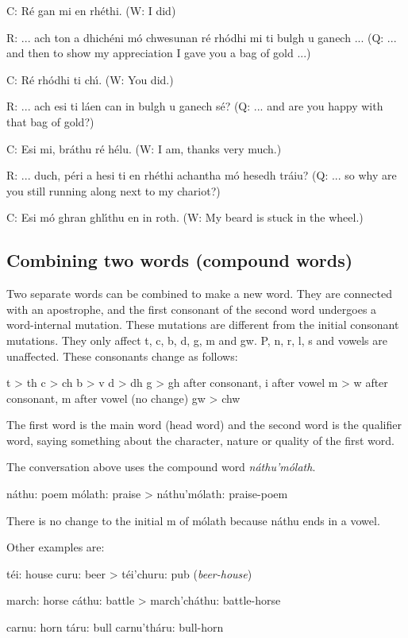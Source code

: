 C: R\'{e} gan mi en rh\'{e}thi.
(W: I did)

R: ... ach ton a dhich\'{e}ni m\'{o} chwesunan r\'{e} rh\'{o}dhi mi ti bulgh u ganech ...
(Q: ... and then to show my appreciation I gave you a bag of gold ...)

C: R\'{e} rh\'{o}dhi ti ch\'{\i}.
(W: You did.)

R: ... ach esi ti l\'{a}en can in bulgh u ganech s\'{e}?
(Q: ... and are you happy with that bag of gold?)

C: Esi mi, br\'{a}thu r\'{e} h\'{e}lu.
(W: I am, thanks very much.)

R: ... duch, p\'{e}ri a hesi ti en rh\'{e}thi achantha m\'{o} hesedh tr\'{a}iu?
(Q: ... so why are you still running along next to my chariot?)

C: Esi m\'{o} ghran ghl\'{\i}thu en in roth.
(W: My beard is stuck in the wheel.)

\subsection{Combining two words (compound words)}

Two separate words can be combined to make a new word. They are connected with an apostrophe, and the first consonant of the second word undergoes a word-internal mutation. These mutations are different from the initial consonant mutations. They only affect t, c, b, d, g, m and gw. P, n, r, l, s and vowels are unaffected. These consonants change as follows:

t > th
c > ch
b > v
d > dh
g > gh after consonant, i after vowel
m > w after consonant, m after vowel (no change)
gw > chw

The first word is the main word (head word) and the second word is the qualifier word, saying something about the character, nature or quality of the first word.

The conversation above uses the compound word \textit{n\'{a}thu'm\'{o}lath}.

n\'{a}thu: poem
m\'{o}lath: praise
> n\'{a}thu'm\'{o}lath: praise-poem

There is no change to the initial m of m\'{o}lath because n\'{a}thu ends in a vowel.

Other examples are:

t\'{e}i: house
curu: beer
> t\'{e}i'churu: pub (\textit{beer-house})

march: horse
c\'{a}thu: battle
> march'ch\'{a}thu: battle-horse

carnu: horn
t\'{a}ru: bull
carnu'th\'{a}ru: bull-horn

